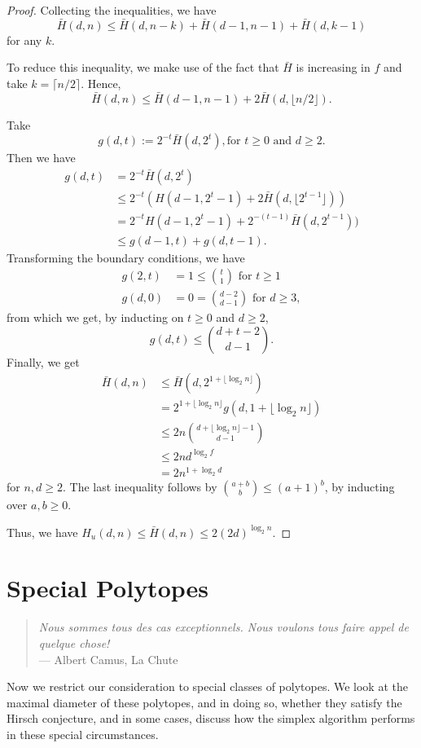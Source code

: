 \documentclass[11pt,a4paper]{article}
\theoremstyle{definition}
\begin{document}
\begin{proof}
Collecting the inequalities, we have
$$\bar{H}(d,n)\le\bar{H}(d,n-k)+\bar{H}(d-1,n-1)+\bar{H}(d,k-1)$$
for any $k$.

To reduce this inequality, we make use of the fact that $\bar{H}$ is increasing in $f$ and take $k=\lceil n/2\rceil$. Hence,
$$\bar{H}(d,n)\le\bar{H}(d-1,n-1)+2\bar{H}(d,\lfloor n/2\rfloor).$$

Take
$$g(d,t):=2^{-t}\bar{H}(d,2^t), \text{for $t\ge 0$ and }d\ge 2.$$
Then we have
\begin{align*}
	g(d,t)&=2^{-t}\bar{H}(d,2^t)\\
	&\le 2^{-t}(H(d-1,2^t-1)+2\bar{H}(d,\lfloor 2^{t-1}\rfloor))\\
	&=2^{-t}H(d-1,2^t-1)+2^{-(t-1)}\bar{H}(d,2^{t-1}))\\
	&\le g(d-1,t)+g(d,t-1).
\end{align*}
Transforming the boundary conditions, we have
\begin{align*}
	g(2,t)&=1\le{t \choose 1} \text{ for }t\ge 1\\
	g(d,0)&=0={d-2\choose d-1}\text{ for }d\ge 3,
\end{align*}
from which we get, by inducting on $t\ge 0$ and $d\ge 2$,
$$g(d,t)\le{d+t-2\choose d-1}.$$
Finally, we get
\begin{align*}
	\bar{H}(d,n)&\le\bar{H}(d,2^{1+\lfloor\log_2 n\rfloor})\\
	&=2^{1+\lfloor\log_2 n\rfloor}g(d,1+\lfloor\log_2 n\rfloor)\\
	&\le 2n{d+\lfloor\log_2 n\rfloor-1\choose d-1}\\
	&\le 2nd^{\log_2 f}\\
	&=2n^{1+\log_2 d}
\end{align*}
for $n,d\ge 2$. The last inequality follows by ${a+b\choose b}\le(a+1)^b$, by inducting over $a,b\ge 0$.

Thus, we have $H_u(d,n)\le\bar{H}(d,n)\le 2(2d)^{\log_2 n}$.
\end{proof}

\section{Special Polytopes}
\begin{quote}
	\emph{Nous sommes tous des cas exceptionnels. Nous voulons tous faire appel de quelque chose!}\\
	--- Albert Camus, La Chute
\end{quote}
Now we restrict our consideration to special classes of polytopes. We look at the maximal diameter of these polytopes, and in doing so, whether they satisfy the Hirsch conjecture, and in some cases, discuss how the simplex algorithm performs in these special circumstances.
\end{document}
